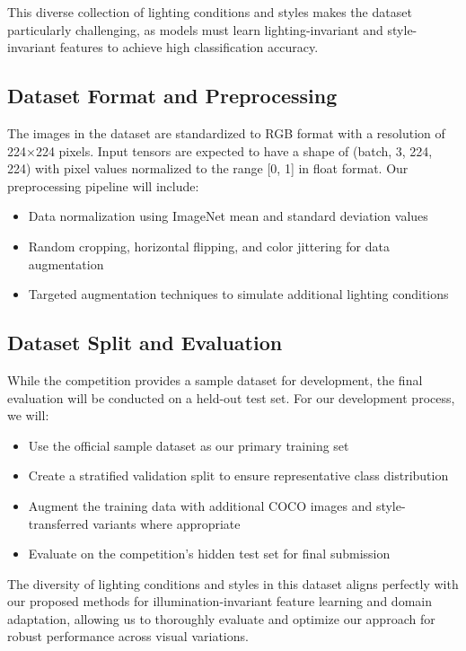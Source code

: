 \documentclass[11pt, oneside]{article}   	%
\begin{document}
This diverse collection of lighting conditions and styles makes the dataset particularly challenging, as models must learn lighting-invariant and style-invariant features to achieve high classification accuracy.

\subsection*{Dataset Format and Preprocessing}

The images in the dataset are standardized to RGB format with a resolution of 224×224 pixels. Input tensors are expected to have a shape of (batch, 3, 224, 224) with pixel values normalized to the range [0, 1] in float format. Our preprocessing pipeline will include:

\begin{itemize}
	\item Data normalization using ImageNet mean and standard deviation values
	\item Random cropping, horizontal flipping, and color jittering for data augmentation
	\item Targeted augmentation techniques to simulate additional lighting conditions
\end{itemize}

\subsection*{Dataset Split and Evaluation}

While the competition provides a sample dataset for development, the final evaluation will be conducted on a held-out test set. For our development process, we will:

\begin{itemize}
	\item Use the official sample dataset as our primary training set
	\item Create a stratified validation split to ensure representative class distribution
	\item Augment the training data with additional COCO images and style-transferred variants where appropriate
	\item Evaluate on the competition's hidden test set for final submission
\end{itemize}

The diversity of lighting conditions and styles in this dataset aligns perfectly with our proposed methods for illumination-invariant feature learning and domain adaptation, allowing us to thoroughly evaluate and optimize our approach for robust performance across visual variations.
\end{document}
